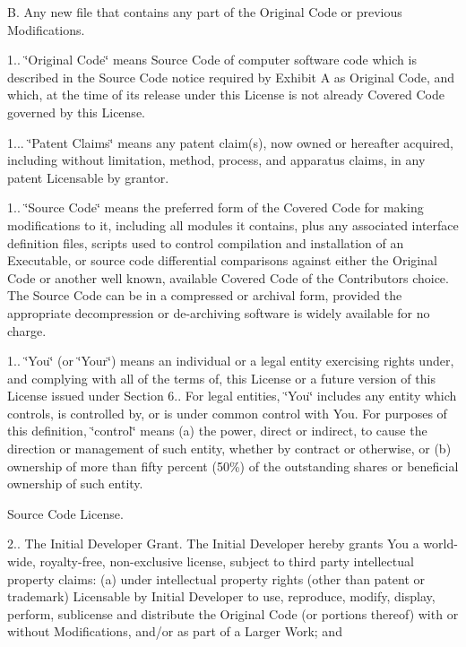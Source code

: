 \begin{DoxyEnumerate}
B. Any new file that contains any part of the Original Code or previous Modifications.

1.. \char`\"{}\+Original Code\char`\"{} means Source Code of computer software code which is described in the Source Code notice required by Exhibit A as Original Code, and which, at the time of its release under this License is not already Covered Code governed by this License.

1... \char`\"{}\+Patent Claims\char`\"{} means any patent claim(s), now owned or hereafter acquired, including without limitation, method, process, and apparatus claims, in any patent Licensable by grantor.

1.. \char`\"{}\+Source Code\char`\"{} means the preferred form of the Covered Code for making modifications to it, including all modules it contains, plus any associated interface definition files, scripts used to control compilation and installation of an Executable, or source code differential comparisons against either the Original Code or another well known, available Covered Code of the Contributor\textquotesingle{}s choice. The Source Code can be in a compressed or archival form, provided the appropriate decompression or de-\/archiving software is widely available for no charge.

1.. \char`\"{}\+You\char`\"{} (or \char`\"{}\+Your\char`\"{}) means an individual or a legal entity exercising rights under, and complying with all of the terms of, this License or a future version of this License issued under Section 6.. For legal entities, \char`\"{}\+You\char`\"{} includes any entity which controls, is controlled by, or is under common control with You. For purposes of this definition, \char`\"{}control\char`\"{} means (a) the power, direct or indirect, to cause the direction or management of such entity, whether by contract or otherwise, or (b) ownership of more than fifty percent (50\%) of the outstanding shares or beneficial ownership of such entity.
\item Source Code License.

2.. The Initial Developer Grant. The Initial Developer hereby grants You a world-\/wide, royalty-\/free, non-\/exclusive license, subject to third party intellectual property claims\+: (a) under intellectual property rights (other than patent or trademark) Licensable by Initial Developer to use, reproduce, modify, display, perform, sublicense and distribute the Original Code (or portions thereof) with or without Modifications, and/or as part of a Larger Work; and


\end{DoxyEnumerate}
